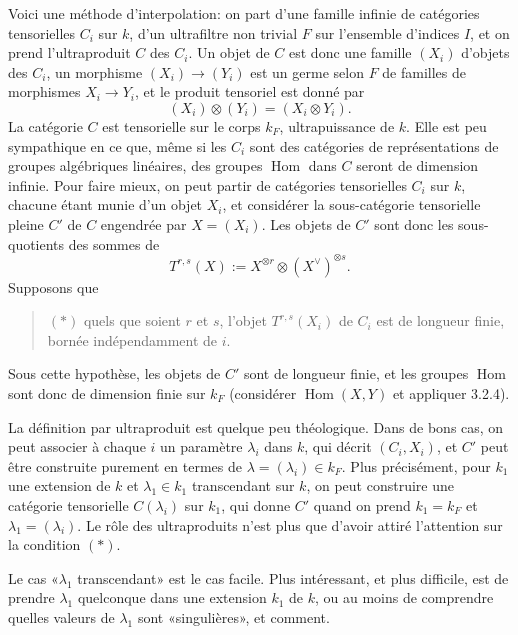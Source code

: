 \documentclass[11pt]{article}
\newcommand{\Hom}{\operatorname{Hom}}
\theoremstyle{deligne}
\begin{document}
Voici une méthode d'interpolation: on part d'une famille infinie de catégories tensorielles \(C_i\) sur \(k\), d'un ultrafiltre non trivial \(F\) sur l'ensemble d'indices \(I\), et on prend l'ultraproduit \(C\) des \(C_i\). Un objet de \(C\) est donc une famille \((X_i)\) d'objets des \(C_i\), un morphisme \((X_i)\to (Y_i)\) est un germe selon \(F\) de familles de morphismes \(X_i\to Y_i\), et le produit tensoriel est donné par
\[
  (X_i)\otimes (Y_i)=(X_i\otimes Y_i).
\]
La catégorie \(C\) est tensorielle sur le corps \(k_F\), ultrapuissance de \(k\). Elle est peu sympathique en ce que, même si les \(C_i\) sont des catégories de représentations de groupes algébriques linéaires, des groupes \(\Hom\) dans \(C\) seront de dimension infinie. Pour faire mieux, on peut partir de catégories tensorielles \(C_i\) sur \(k\), chacune étant munie d'un objet \(X_i\), et considérer la sous-catégorie tensorielle pleine \(C'\) de \(C\) engendrée par \(X=(X_i)\). Les objets de \(C'\) sont donc les sous-quotients des sommes de
\[
  T^{r,s}(X):=X^{\otimes r}\otimes (X^\vee)^{\otimes s}.
\]
Supposons que
\begin{quote}
\((*)\) quels que soient \(r\) et \(s\), l'objet \(T^{r,s}(X_i)\) de \(C_i\) est de longueur finie, bornée indépendamment de \(i\).
\end{quote}
Sous cette hypothèse, les objets de \(C'\) sont de longueur finie, et les groupes \(\Hom\) sont donc de dimension finie sur \(k_F\) (considérer \(\Hom(X,Y)\) et appliquer 3.2.4).

La définition par ultraproduit est quelque peu théologique. Dans de bons cas, on peut associer à chaque \(i\) un paramètre \(\lambda_i\) dans \(k\), qui décrit \((C_i,X_i)\), et \(C'\) peut être construite purement en termes de \(\lambda=(\lambda_i)\in k_F\). Plus précisément, pour \(k_1\) une extension de \(k\) et \(\lambda_1\in k_1\) transcendant sur \(k\), on peut construire une catégorie tensorielle \(C(\lambda_i)\) sur \(k_1\), qui donne \(C'\) quand on prend \(k_1=k_F\) et \(\lambda_1=(\lambda_i)\). Le rôle des ultraproduits n'est plus que d'avoir attiré l'attention sur la condition \((*)\).

Le cas «\(\lambda_1\) transcendant» est le cas facile. Plus intéressant, et plus difficile, est de prendre \(\lambda_1\) quelconque dans une extension \(k_1\) de \(k\), ou au moins de comprendre quelles valeurs de \(\lambda_1\) sont «singulières», et comment.
\end{document}
